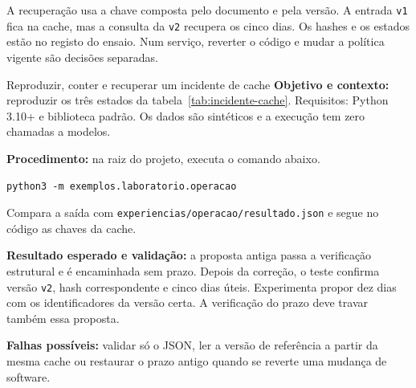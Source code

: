 A recuperação usa a chave composta pelo documento e pela versão. A entrada \texttt{v1} fica na cache, mas a consulta da \texttt{v2} recupera os cinco dias. Os hashes e os estados estão no registo do ensaio. Num serviço, reverter o código e mudar a política vigente são decisões separadas.

\begin{promptlabbox}{Reproduzir, conter e recuperar um incidente de cache}
\textbf{Objetivo e contexto:} reproduzir os três estados da tabela~\ref{tab:incidente-cache}. Requisitos: Python 3.10+ e biblioteca padrão. Os dados são sintéticos e a execução tem zero chamadas a modelos.

\textbf{Procedimento:} na raiz do projeto, executa o comando abaixo.
\par\noindent\texttt{python3 -m exemplos.laboratorio.operacao}\par
Compara a saída com \texttt{experiencias/operacao/resultado.json} e segue no código as chaves da cache.

\textbf{Resultado esperado e validação:} a proposta antiga passa a verificação estrutural e é encaminhada sem prazo. Depois da correção, o teste confirma versão \texttt{v2}, hash correspondente e cinco dias úteis. Experimenta propor dez dias com os identificadores da versão certa. A verificação do prazo deve travar também essa proposta.

\textbf{Falhas possíveis:} validar só o JSON, ler a versão de referência a partir da mesma cache ou restaurar o prazo antigo quando se reverte uma mudança de software.
\end{promptlabbox}
